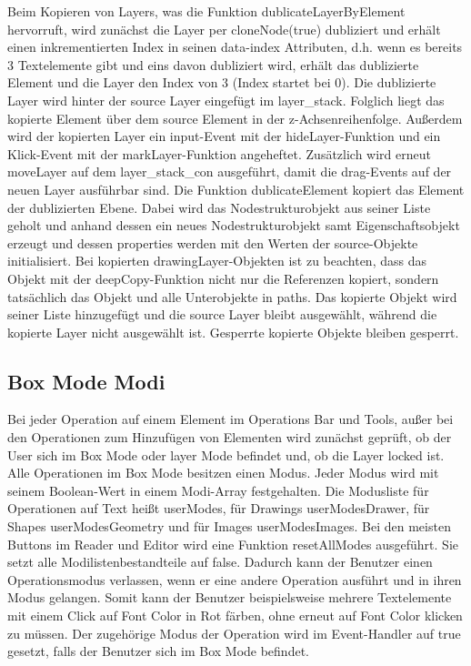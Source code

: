 Beim Kopieren von Layers, was die Funktion dublicateLayerByElement hervorruft, wird zunächst die Layer per cloneNode(true) dubliziert und erhält einen inkrementierten Index in seinen data-index Attributen, d.h. wenn es bereits 3 Textelemente gibt und eins davon dubliziert wird, erhält das dublizierte Element und die Layer den Index von 3 (Index startet bei 0). Die dublizierte Layer wird hinter der source Layer eingefügt im layer\_stack. Folglich liegt das kopierte Element über dem source Element in der z-Achsenreihenfolge. Außerdem wird der kopierten Layer ein input-Event mit der hideLayer-Funktion und ein Klick-Event mit der markLayer-Funktion angeheftet. Zusätzlich wird erneut moveLayer auf dem layer\_stack\_con ausgeführt, damit die drag-Events auf der neuen Layer ausführbar sind. Die Funktion dublicateElement kopiert das Element der dublizierten Ebene. Dabei wird das Nodestrukturobjekt aus seiner Liste geholt und anhand dessen ein neues Nodestrukturobjekt samt Eigenschaftsobjekt erzeugt und dessen properties werden mit den Werten der source-Objekte initialisiert. Bei kopierten drawingLayer-Objekten ist zu beachten, dass das Objekt mit der deepCopy-Funktion nicht nur die Referenzen kopiert, sondern tatsächlich das Objekt und alle Unterobjekte in paths. Das kopierte Objekt wird seiner Liste hinzugefügt und die source Layer bleibt ausgewählt, während die kopierte Layer nicht ausgewählt ist. Gesperrte kopierte Objekte bleiben gesperrt.

\subsection{Box Mode Modi}
Bei jeder Operation auf einem Element im Operations Bar und Tools, außer bei den Operationen zum Hinzufügen von Elementen wird zunächst geprüft, ob der User sich im Box Mode oder layer Mode befindet und, ob die Layer locked ist. Alle Operationen im Box Mode besitzen einen Modus. Jeder Modus wird mit seinem Boolean-Wert in einem Modi-Array festgehalten. Die Modusliste für Operationen auf Text heißt userModes, für Drawings userModesDrawer, für Shapes userModesGeometry und für Images userModesImages. Bei den meisten Buttons im Reader und Editor wird eine Funktion resetAllModes ausgeführt. Sie setzt alle Modilistenbestandteile auf false. Dadurch kann der Benutzer einen Operationsmodus verlassen, wenn er eine andere Operation ausführt und in ihren Modus gelangen. Somit kann der Benutzer beispielsweise mehrere Textelemente mit einem Click auf Font Color in Rot färben, ohne erneut auf Font Color klicken zu müssen. Der zugehörige Modus der Operation wird im Event-Handler auf true gesetzt, falls der Benutzer sich im Box Mode befindet.

